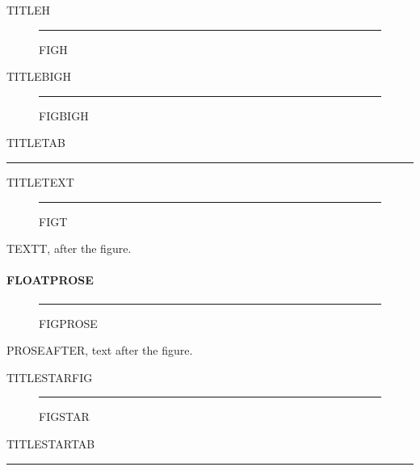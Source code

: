 \documentclass[a4paper]{memoir}
\begin{document}
\begin{frame}{TITLEH}
  \begin{figure}[h]
    \centering\rule{4cm}{1cm}
    \caption{FIGH}
  \end{figure}
\end{frame}
\begin{frame}{TITLEBIGH}
  \begin{figure}[H]
    \centering\rule{4cm}{1cm}
    \caption{FIGBIGH}
  \end{figure}
\end{frame}
\begin{frame}{TITLETAB}
  \begin{table}[h]
    \centering\rule{4cm}{1cm}
    \caption{TABH}
  \end{table}
\end{frame}
\begin{frame}{TITLETEXT}
  \begin{figure}[h]
    \centering\rule{4cm}{1cm}
    \caption{FIGT}
  \end{figure}
  TEXTT, after the figure.
\end{frame}

\paragraph*{FLOATPROSE}
\begin{figure}[h]
  \centering\rule{4cm}{1cm}
  \caption{FIGPROSE}
\end{figure}
PROSEAFTER, text after the figure.

\clearpage
\begin{frame}{TITLESTARFIG}
  \begin{figure}[h]
    \centering\rule{4cm}{1mm}
    \caption{FIGSTAR}
  \end{figure}
\end{frame}
\begin{frame}{TITLESTARTAB}
  \begin{table}[h]
    \centering\rule{4cm}{1mm}
    \caption{TABSTAR}
  \end{table}
\end{frame}
\end{document}
